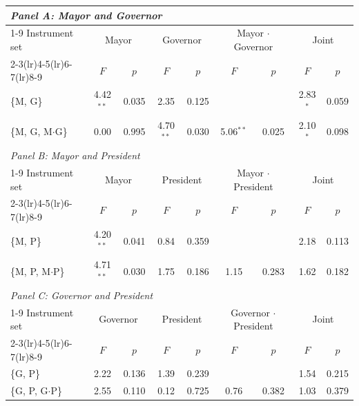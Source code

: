\begin{tabular}{@{}lcccccccc@{}}
\toprule
\multicolumn{9}{l}{\textit{Panel A: Mayor and Governor}} \\
\cmidrule(lr){1-9}
Instrument set & \multicolumn{2}{c}{Mayor} & \multicolumn{2}{c}{Governor} & \multicolumn{2}{c}{Mayor $\cdot$ Governor} & \multicolumn{2}{c}{Joint} \\
\cmidrule(lr){2-3}\cmidrule(lr){4-5}\cmidrule(lr){6-7}\cmidrule(lr){8-9}
 & $F$ & $p$ & $F$ & $p$ & $F$ & $p$ & $F$ & $p$ \\
\midrule
\{M, G\} & 4.42$^{**}$ & 0.035 & 2.35 & 0.125 &  &  & 2.83$^{*}$ & 0.059 \\
\{M, G, M$\cdot$G\} & 0.00 & 0.995 & 4.70$^{**}$ & 0.030 & 5.06$^{**}$ & 0.025 & 2.10$^{*}$ & 0.098 \\
\midrule
\multicolumn{9}{l}{\textit{Panel B: Mayor and President}} \\
\cmidrule(lr){1-9}
Instrument set & \multicolumn{2}{c}{Mayor} & \multicolumn{2}{c}{President} & \multicolumn{2}{c}{Mayor $\cdot$ President} & \multicolumn{2}{c}{Joint} \\
\cmidrule(lr){2-3}\cmidrule(lr){4-5}\cmidrule(lr){6-7}\cmidrule(lr){8-9}
 & $F$ & $p$ & $F$ & $p$ & $F$ & $p$ & $F$ & $p$ \\
\midrule
\{M, P\} & 4.20$^{**}$ & 0.041 & 0.84 & 0.359 &  &  & 2.18 & 0.113 \\
\{M, P, M$\cdot$P\} & 4.71$^{**}$ & 0.030 & 1.75 & 0.186 & 1.15 & 0.283 & 1.62 & 0.182 \\
\midrule
\multicolumn{9}{l}{\textit{Panel C: Governor and President}} \\
\cmidrule(lr){1-9}
Instrument set & \multicolumn{2}{c}{Governor} & \multicolumn{2}{c}{President} & \multicolumn{2}{c}{Governor $\cdot$ President} & \multicolumn{2}{c}{Joint} \\
\cmidrule(lr){2-3}\cmidrule(lr){4-5}\cmidrule(lr){6-7}\cmidrule(lr){8-9}
 & $F$ & $p$ & $F$ & $p$ & $F$ & $p$ & $F$ & $p$ \\
\midrule
\{G, P\} & 2.22 & 0.136 & 1.39 & 0.239 &  &  & 1.54 & 0.215 \\
\{G, P, G$\cdot$P\} & 2.55 & 0.110 & 0.12 & 0.725 & 0.76 & 0.382 & 1.03 & 0.379 \\
\bottomrule
\end{tabular}
